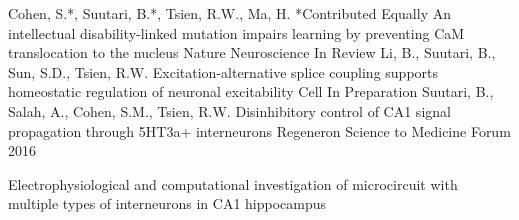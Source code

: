 


\begin{cventries}


\cventry
{Cohen, S.*, Suutari, B.*, Tsien, R.W., Ma, H. \newline \mbox{*}Contributed Equally} %
{An intellectual disability-linked mutation impairs learning by preventing CaM translocation to the nucleus} %
{Nature Neuroscience} %
{In Review} %
{ %
}
\cventry
{Li, B., Suutari, B., Sun, S.D., Tsien, R.W.} %
{Excitation-alternative splice coupling supports 
homeostatic regulation of neuronal excitability} %
{Cell} %
{In Preparation} %
{ %
}
\cventry
{Suutari, B., Salah, A., Cohen, S.M., Tsien, R.W.} %
{Disinhibitory control of CA1 signal propagation through 5HT3a+ interneurons} %
{Regeneron Science to Medicine Forum} %
{2016} %
{ %
\begin{cvitems}
\item {Electrophysiological and computational investigation of microcircuit with multiple types of interneurons in CA1 hippocampus}
\end{cvitems}
}


\end{cventries}
